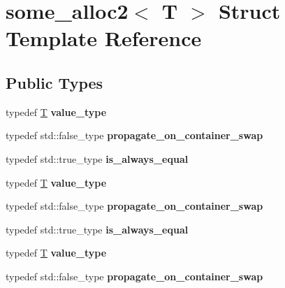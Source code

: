 \hypertarget{structsome__alloc2}{}\section{some\+\_\+alloc2$<$ T $>$ Struct Template Reference}
\label{structsome__alloc2}
\subsection*{Public Types}
\begin{DoxyCompactItemize}
\item 
\mbox{\label{structsome__alloc2_ab7bdd83edbd79faad769611dbbd19a5e}} 
typedef \mbox{\hyperlink{struct_t}{T}} {\bfseries value\+\_\+type}
\item 
\mbox{\label{structsome__alloc2_ad1d285ccc9f402a42deed26170af62e9}} 
typedef std\+::false\+\_\+type {\bfseries propagate\+\_\+on\+\_\+container\+\_\+swap}
\item 
\mbox{\label{structsome__alloc2_acc5ede9dcfed27470598992af2c07bfb}} 
typedef std\+::true\+\_\+type {\bfseries is\+\_\+always\+\_\+equal}
\item 
\mbox{\label{structsome__alloc2_ab7bdd83edbd79faad769611dbbd19a5e}} 
typedef \mbox{\hyperlink{struct_t}{T}} {\bfseries value\+\_\+type}
\item 
\mbox{\label{structsome__alloc2_ad1d285ccc9f402a42deed26170af62e9}} 
typedef std\+::false\+\_\+type {\bfseries propagate\+\_\+on\+\_\+container\+\_\+swap}
\item 
\mbox{\label{structsome__alloc2_acc5ede9dcfed27470598992af2c07bfb}} 
typedef std\+::true\+\_\+type {\bfseries is\+\_\+always\+\_\+equal}
\item 
\mbox{\label{structsome__alloc2_ab7bdd83edbd79faad769611dbbd19a5e}} 
typedef \mbox{\hyperlink{struct_t}{T}} {\bfseries value\+\_\+type}
\item 
\mbox{\label{structsome__alloc2_ad1d285ccc9f402a42deed26170af62e9}} 
typedef std\+::false\+\_\+type {\bfseries propagate\+\_\+on\+\_\+container\+\_\+swap}

\end{DoxyCompactItemize}
